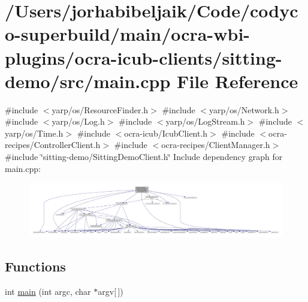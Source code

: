 \hypertarget{ocra-icub-clients_2sitting-demo_2src_2main_8cpp}{}\section{/\+Users/jorhabibeljaik/\+Code/codyco-\/superbuild/main/ocra-\/wbi-\/plugins/ocra-\/icub-\/clients/sitting-\/demo/src/main.cpp File Reference}
\label{ocra-icub-clients_2sitting-demo_2src_2main_8cpp}
{\ttfamily \#include $<$yarp/os/\+Resource\+Finder.\+h$>$}\newline
{\ttfamily \#include $<$yarp/os/\+Network.\+h$>$}\newline
{\ttfamily \#include $<$yarp/os/\+Log.\+h$>$}\newline
{\ttfamily \#include $<$yarp/os/\+Log\+Stream.\+h$>$}\newline
{\ttfamily \#include $<$yarp/os/\+Time.\+h$>$}\newline
{\ttfamily \#include $<$ocra-\/icub/\+Icub\+Client.\+h$>$}\newline
{\ttfamily \#include $<$ocra-\/recipes/\+Controller\+Client.\+h$>$}\newline
{\ttfamily \#include $<$ocra-\/recipes/\+Client\+Manager.\+h$>$}\newline
{\ttfamily \#include \char`\"{}sitting-\/demo/\+Sitting\+Demo\+Client.\+h\char`\"{}}\newline
Include dependency graph for main.\+cpp\+:\nopagebreak
\begin{figure}[H]
\begin{center}
\leavevmode
\includegraphics[width=350pt]{ocra-icub-clients_2sitting-demo_2src_2main_8cpp__incl}
\end{center}
\end{figure}
\subsection*{Functions}
\begin{DoxyCompactItemize}
\item 
int \hyperlink{ocra-icub-clients_2sitting-demo_2src_2main_8cpp_a0ddf1224851353fc92bfbff6f499fa97}{main} (int argc, char $\ast$argv\mbox{[}$\,$\mbox{]})
\end{DoxyCompactItemize}


